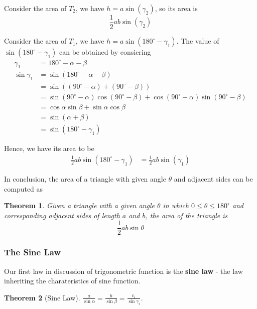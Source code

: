 \documentclass[12pt]{article}
\newtheorem*{theorem}{Theorem}
\begin{document}
    Consider the area of $T_2$, we have $h=a\sin(\gamma_2)$, so its area is $$\frac{1}{2}ab\sin(\gamma_2)$$

    Consider the area of $T_1$, we have $h=a\sin(180^\circ - \gamma_1)$. The value of $\sin(180^\circ - \gamma_1)$ can be obtained by consiering \begin{align*}
        \gamma_1 &= 180^\circ - \alpha - \beta\\
        \sin{\gamma_1}&=\sin(180^\circ - \alpha - \beta)\\
        &=\sin((90^\circ - \alpha) + (90^\circ - \beta))\\
        &=\sin(90^\circ - \alpha)\cos(90^\circ - \beta)+ \cos(90^\circ - \alpha)\sin(90^\circ - \beta)\\
        &=\cos{\alpha}\sin{\beta}+\sin{\alpha}\cos{\beta}\\
        &=\sin(\alpha+\beta)\\
        &=\sin(180^\circ - \gamma_1)
    \end{align*}

    Hence, we have its area to be \begin{align*}
        \frac{1}{2}ab\sin(180^\circ - \gamma_1)&=\frac{1}{2}ab\sin(\gamma_1)
    \end{align*}

    In conclusion, the area of a triangle with given angle $\theta$ and adjacent sides can be computed as 

    \begin{theorem}
        Given a triangle with a given angle $\theta$ in which $0\leq \theta\leq 180^\circ$ and corresponding adjacent sides of length $a$ and $b$, the area of the triangle is $$\frac{1}{2}ab\sin{\theta}$$
    \end{theorem}

    \subsubsection*{The Sine Law}

    Our first law in discussion of trigonometric function is the \textbf{sine law} - the law inheriting the charateristics of sine function.

    \begin{theorem}[Sine Law]
        $\displaystyle \frac{a}{\sin{\alpha}}=\frac{b}{\sin{\beta}}=\frac{c_i}{\sin{\gamma_i}}$.
    \end{theorem}
\end{document}
